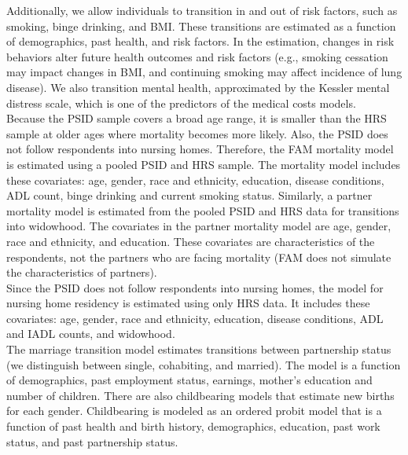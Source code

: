 \noindent Additionally, we allow individuals to transition in and out of risk factors, such as smoking, binge drinking, and BMI. These transitions are estimated as a function of demographics, past health, and risk factors.
In the estimation, changes in risk behaviors alter future health outcomes and risk factors (e.g., smoking cessation may impact changes in BMI, and continuing smoking may affect incidence of lung disease). We also transition mental health, approximated by the Kessler mental distress scale, which is one of the predictors of the medical costs models.
\\


\noindent Because the PSID sample covers a broad age range, it is smaller than the HRS sample at older ages where mortality becomes more likely. Also, the PSID does not follow respondents into nursing homes.
Therefore, the FAM mortality model is estimated using a pooled PSID and HRS sample.
The mortality model includes these covariates: age, gender, race and ethnicity, education, disease conditions, ADL count, binge drinking and current smoking status.
Similarly, a partner mortality model is estimated from the pooled PSID and HRS data for transitions into widowhood.
The covariates in the partner mortality model are age, gender, race and ethnicity, and education.
These covariates are characteristics of the respondents, not the partners who are facing mortality (FAM does not simulate the characteristics of partners). \\

\noindent Since the PSID does not follow respondents into nursing homes, the model for nursing home residency is estimated using only HRS data. It includes these covariates: age, gender, race and ethnicity, education, disease conditions, ADL and IADL counts, and widowhood. \\

\noindent The marriage transition model estimates transitions between partnership status (we distinguish between single, cohabiting, and married).
The model is a function of demographics, past employment status, earnings, mother's education and number of children.
There are also childbearing models that estimate new births for each gender.
Childbearing is modeled as an ordered probit model that is a function of past health and birth history, demographics, education, past work status, and past partnership status. \\

